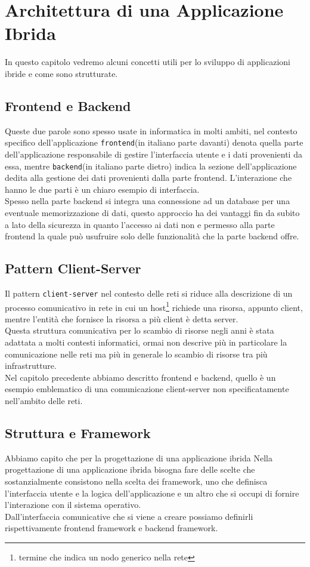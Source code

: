 \chapter{Architettura di una Applicazione Ibrida}
In questo capitolo vedremo alcuni concetti utili per lo sviluppo di applicazioni ibride e come sono strutturate.
\section{Frontend e Backend}
Queste due parole sono spesso usate in informatica in molti ambiti, nel contesto specifico dell'applicazione \texttt{frontend}(in italiano parte davanti) denota quella parte dell'applicazione responsabile di gestire l'interfaccia utente e i dati provenienti da essa, mentre \texttt{backend}(in italiano parte dietro) indica la sezione dell'applicazione dedita alla gestione dei dati provenienti dalla parte frontend. L'interazione che hanno le due parti è un chiaro esempio di interfaccia.\\
Spesso nella parte backend si integra una connessione ad un database per una eventuale memorizzazione di dati, questo approccio ha dei vantaggi fin da subito a lato della sicurezza in quanto l'accesso ai dati non e permesso alla parte frontend la quale può usufruire solo delle funzionalità che la parte backend offre.
\section{Pattern Client-Server}
Il pattern \texttt{client-server} nel contesto delle reti si riduce alla descrizione di un processo comunicativo in rete in cui un host\footnote{termine che indica un nodo generico nella rete} richiede una risorsa, appunto client, mentre l'entità che fornisce la risorsa a più client è detta server. \\
Questa struttura comunicativa per lo scambio di risorse negli anni è stata adattata a molti contesti informatici, ormai non descrive più in particolare la comunicazione nelle reti ma più in generale lo scambio di risorse tra più infrastrutture.\\
Nel capitolo precedente abbiamo descritto frontend e backend, quello è un esempio emblematico di una comunicazione client-server non specificatamente nell'ambito delle reti.
\section{Struttura e Framework}
Abbiamo capito che per la progettazione di una applicazione ibrida
Nella progettazione di una applicazione ibrida bisogna fare delle scelte che sostanzialmente consistono nella scelta dei framework, uno che definisca l'interfaccia utente e la logica dell'applicazione e un altro che si occupi di fornire l'interazione con il sistema operativo.\\
Dall'interfaccia comunicative che si viene a creare possiamo definirli rispettivamente frontend framework e backend framework.

